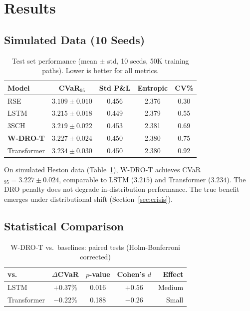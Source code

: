 \documentclass[11pt]{article}
\begin{document}
\section{Results}
\label{sec:results}

\subsection{Simulated Data (10 Seeds)}

\begin{table}[t]
\centering
\caption{Test set performance (mean $\pm$ std, 10 seeds, 50K training paths). Lower is better for all metrics.}
\label{tab:main}
\small
\begin{tabular}{lcccc}
\toprule
\textbf{Model} & \textbf{CVaR$_{95}$} & \textbf{Std P\&L} & \textbf{Entropic} & \textbf{CV\%} \\
\midrule
RSE & $3.109 \pm 0.010$ & 0.456 & 2.376 & 0.30 \\
LSTM & $3.215 \pm 0.018$ & 0.449 & 2.379 & 0.55 \\
3SCH & $3.219 \pm 0.022$ & 0.453 & 2.381 & 0.69 \\
\textbf{W-DRO-T} & $3.227 \pm 0.024$ & 0.450 & 2.380 & 0.75 \\
Transformer & $3.234 \pm 0.030$ & 0.450 & 2.380 & 0.92 \\
\bottomrule
\end{tabular}
\end{table}

On simulated Heston data (Table~\ref{tab:main}), W-DRO-T achieves CVaR$_{95} = 3.227 \pm 0.024$, comparable to LSTM ($3.215$) and Transformer ($3.234$). The DRO penalty does not degrade in-distribution performance. The true benefit emerges under distributional shift (Section~\ref{sec:crisis}).

\subsection{Statistical Comparison}

\begin{table}[t]
\centering
\caption{W-DRO-T vs.\ baselines: paired tests (Holm-Bonferroni corrected)}
\label{tab:stats}
\small
\begin{tabular}{lcccr}
\toprule
\textbf{vs.} & \textbf{$\Delta$CVaR} & \textbf{$p$-value} & \textbf{Cohen's $d$} & \textbf{Effect} \\
\midrule
LSTM & $+0.37\%$ & 0.016 & $+0.56$ & Medium \\
Transformer & $-0.22\%$ & 0.188 & $-0.26$ & Small \\
\bottomrule
\end{tabular}
\end{table}
\end{document}
